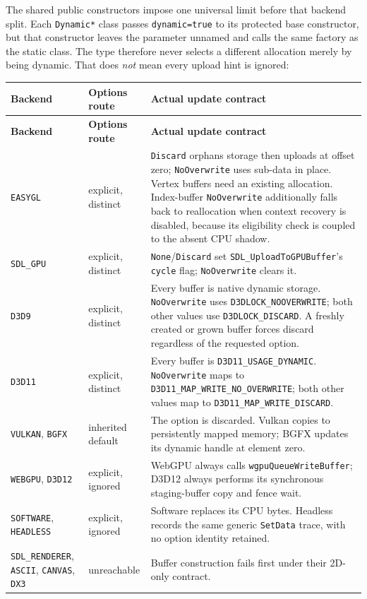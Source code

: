 The shared public constructors impose one universal limit before that backend split. Each
\texttt{Dynamic*} class passes \texttt{dynamic=true} to its protected base constructor, but
that constructor leaves the parameter unnamed and calls the same factory as the static class.
The type therefore never selects a different allocation merely by being dynamic. That does
\emph{not} mean every upload hint is ignored:

\begingroup
\small
\setlength{\tabcolsep}{4pt}
\renewcommand{\arraystretch}{1.15}
\begin{longtable}{@{}p{}p{}p{}@{}}
\toprule
\textbf{Backend} & \textbf{Options route} & \textbf{Actual update contract} \\
\midrule
\endfirsthead
\toprule
\textbf{Backend} & \textbf{Options route} & \textbf{Actual update contract} \\
\midrule
\endhead
\texttt{EASYGL}
  & explicit, distinct & \texttt{Discard} orphans storage then uploads at offset zero;
    \texttt{NoOverwrite} uses sub-data in place. Vertex buffers need an existing allocation.
    Index-buffer \texttt{NoOverwrite} additionally falls back to reallocation when context
    recovery is disabled, because its eligibility check is coupled to the absent CPU shadow. \\
\texttt{SDL\_GPU}
  & explicit, distinct & \texttt{None}/\texttt{Discard} set
    \texttt{SDL\_UploadToGPUBuffer}'s \texttt{cycle} flag; \texttt{NoOverwrite} clears it. \\
\texttt{D3D9}
  & explicit, distinct & Every buffer is native dynamic storage. \texttt{NoOverwrite} uses
    \texttt{D3DLOCK\_NOOVERWRITE}; both other values use \texttt{D3DLOCK\_DISCARD}.
    A freshly created or grown buffer forces discard regardless of the requested option. \\
\texttt{D3D11}
  & explicit, distinct & Every buffer is \texttt{D3D11\_USAGE\_DYNAMIC}.
    \texttt{NoOverwrite} maps to \texttt{D3D11\_MAP\_WRITE\_NO\_OVERWRITE}; both other values
    map to \texttt{D3D11\_MAP\_WRITE\_DISCARD}. \\
\texttt{VULKAN}, \texttt{BGFX}
  & inherited default & The option is discarded. Vulkan copies to persistently mapped memory;
    BGFX updates its dynamic handle at element zero. \\
\texttt{WEBGPU}, \texttt{D3D12}
  & explicit, ignored & WebGPU always calls \texttt{wgpuQueueWriteBuffer}; D3D12 always performs
    its synchronous staging-buffer copy and fence wait. \\
\texttt{SOFTWARE}, \texttt{HEADLESS}
  & explicit, ignored & Software replaces its CPU bytes. Headless records the same generic
    \texttt{SetData} trace, with no option identity retained. \\
\texttt{SDL\_RENDERER}, \texttt{ASCII}, \texttt{CANVAS}, \texttt{DX3}
  & unreachable & Buffer construction fails first under their 2D-only contract. \\
\bottomrule
\end{longtable}
\endgroup

